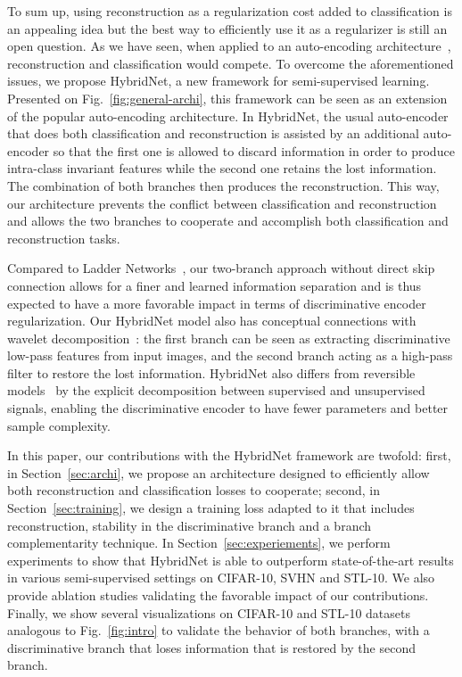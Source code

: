 \documentclass[runningheads]{llncs}
\begin{document}
To sum up, using reconstruction as a regularization cost added to classification is an appealing idea but the best way to efficiently use it as a regularizer is still an open question. As we have seen, when applied to an auto-encoding architecture~\cite{Zhao2016a,Zhang2016a}, reconstruction and classification would compete. To overcome the aforementioned issues, we propose HybridNet, a new framework for semi-supervised learning. Presented on Fig.~\ref{fig:general-archi}, this framework can be seen as an extension of the popular auto-encoding architecture.
In HybridNet, the usual auto-encoder that does both classification and reconstruction is assisted by an additional auto-encoder so that the first one is allowed to discard information in order to produce intra-class invariant features while the second one retains the lost information. The combination of both branches then produces the reconstruction.
This way, our architecture prevents the conflict between classification and reconstruction and allows the two branches to cooperate and accomplish both classification and reconstruction tasks.

Compared to Ladder Networks~\cite{Rasmus2015}, our two-branch approach without direct skip connection allows for a finer and learned information separation and is thus expected to have a more favorable impact in terms of discriminative encoder regularization. Our HybridNet model also has conceptual connections with wavelet decomposition~\cite{wavelets}: the first branch can be seen as extracting discriminative low-pass features from input images, and the second branch acting as a high-pass filter to restore the lost information. HybridNet also differs from reversible models~\cite{NIPS2017_6816,jacobsen:hal-01712808} by the explicit decomposition between supervised and unsupervised signals, enabling the discriminative encoder to have fewer parameters and better sample complexity.

In this paper, our contributions with the HybridNet framework are twofold: first, in Section~\ref{sec:archi}, we propose an architecture designed to efficiently allow both reconstruction and classification losses to cooperate; second, in Section~\ref{sec:training}, we design a training loss adapted to it that includes reconstruction, stability in the discriminative branch and a branch complementarity technique. In Section~\ref{sec:experiements}, we perform experiments to show that HybridNet is able to outperform state-of-the-art results in various semi-supervised settings on CIFAR-10, SVHN and STL-10. We also provide ablation studies validating the favorable impact of our contributions. Finally, we show several visualizations on CIFAR-10 and STL-10 datasets analogous to Fig.~\ref{fig:intro} to validate the behavior of both branches, with a discriminative branch that loses information that is restored by the second branch.
\end{document}
